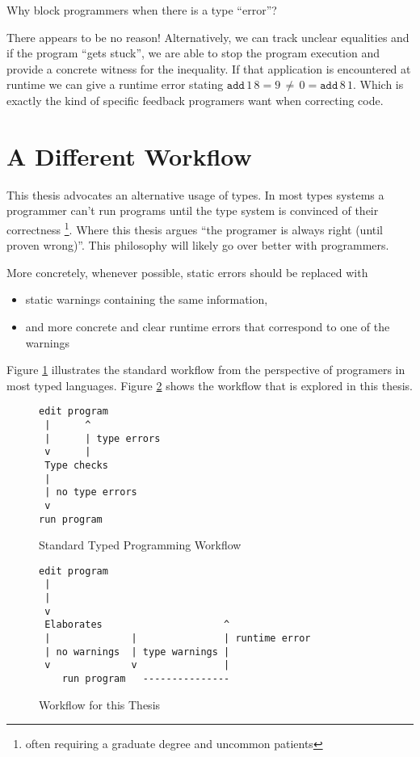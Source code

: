 Why block programmers when there is a type ``error''? 

There appears to be no reason! Alternatively, we can track unclear
equalities and if the program ``gets stuck'', we are able to stop
the program execution and provide a concrete witness for the inequality.
If that application is encountered at runtime we can give a runtime
error stating $\mathtt{add}\,1\,8=9\,\neq\,0=\mathtt{add}\,8\,1$.
Which is exactly the kind of specific feedback programers want when
correcting code.

\section{A Different Workflow}

This thesis advocates an alternative usage of types. In most types
systems a programmer can't run programs until the type system is convinced
of their correctness \footnote{often requiring a graduate degree and uncommon patients}.
Where this thesis argues ``the programer is always right (until proven
wrong)''. This philosophy will likely go over better with programmers.

More concretely, whenever possible, static errors should be replaced
with 
\begin{itemize}
\item static warnings containing the same information, 
\item and more concrete and clear runtime errors that correspond to one
of the warnings
\end{itemize}
Figure \ref{fig:intro-standard-workflow} illustrates the standard
workflow from the perspective of programers in most typed languages.
Figure \ref{fig:intro-thesis-workflow} shows the workflow that is
explored in this thesis. 

\begin{figure}
\begin{lstlisting}
edit program
 |      ^
 |      | type errors
 v      |
 Type checks
 |
 | no type errors
 v
run program
\end{lstlisting}


\caption{Standard Typed Programming Workflow}
\label{fig:intro-standard-workflow}
\end{figure}

\begin{figure}
\begin{lstlisting}
edit program
 |      
 |      
 v
 Elaborates                     ^
 |              |               | runtime error
 | no warnings  | type warnings |
 v              v               |
    run program   ---------------
\end{lstlisting}


\caption{Workflow for this Thesis}
\label{fig:intro-thesis-workflow}
\end{figure}

